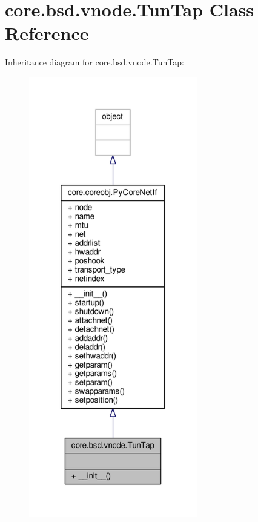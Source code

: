 \hypertarget{classcore_1_1bsd_1_1vnode_1_1_tun_tap}{\section{core.\+bsd.\+vnode.\+Tun\+Tap Class Reference}
\label{classcore_1_1bsd_1_1vnode_1_1_tun_tap}
}


Inheritance diagram for core.\+bsd.\+vnode.\+Tun\+Tap\+:
\nopagebreak
\begin{figure}[H]
\begin{center}
\leavevmode
\includegraphics[width=208pt]{classcore_1_1bsd_1_1vnode_1_1_tun_tap__inherit__graph}
\end{center}
\end{figure}


